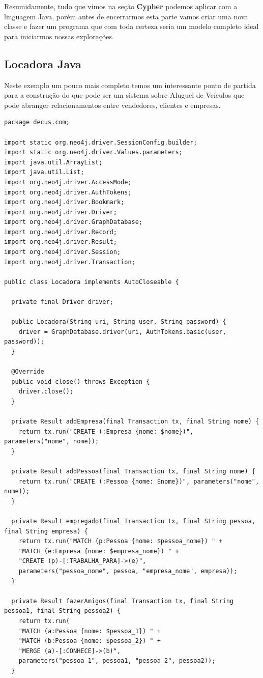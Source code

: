 Resumidamente, tudo que vimos na seção \textbf{Cypher} podemos aplicar com a linguagem Java, porém antes de encerrarmos esta parte vamos criar uma nova classe e fazer um programa que com toda certeza seria um modelo completo ideal para iniciarmos nossas explorações.

\subsection{Locadora Java}
Neste exemplo um pouco mais completo temos um interessante ponto de partida para a construção do que pode ser um sistema sobre Aluguel de Veículos que pode abranger relacionamentos entre vendedores, clientes e empresas.
\begin{lstlisting}[]
package decus.com;

import static org.neo4j.driver.SessionConfig.builder;
import static org.neo4j.driver.Values.parameters;
import java.util.ArrayList;
import java.util.List;
import org.neo4j.driver.AccessMode;
import org.neo4j.driver.AuthTokens;
import org.neo4j.driver.Bookmark;
import org.neo4j.driver.Driver;
import org.neo4j.driver.GraphDatabase;
import org.neo4j.driver.Record;
import org.neo4j.driver.Result;
import org.neo4j.driver.Session;
import org.neo4j.driver.Transaction;

public class Locadora implements AutoCloseable {

  private final Driver driver;
  
  public Locadora(String uri, String user, String password) {
    driver = GraphDatabase.driver(uri, AuthTokens.basic(user, password));
  }

  @Override
  public void close() throws Exception {
    driver.close();
  }

  private Result addEmpresa(final Transaction tx, final String nome) {
    return tx.run("CREATE (:Empresa {nome: $nome})", parameters("nome", nome));
  }

  private Result addPessoa(final Transaction tx, final String nome) {
    return tx.run("CREATE (:Pessoa {nome: $nome})", parameters("nome", nome));
  }

  private Result empregado(final Transaction tx, final String pessoa, final String empresa) {
    return tx.run("MATCH (p:Pessoa {nome: $pessoa_nome}) " +
    "MATCH (e:Empresa {nome: $empresa_nome}) " +
    "CREATE (p)-[:TRABALHA_PARA]->(e)",
    parameters("pessoa_nome", pessoa, "empresa_nome", empresa));
  }

  private Result fazerAmigos(final Transaction tx, final String pessoa1, final String pessoa2) {
    return tx.run(
    "MATCH (a:Pessoa {nome: $pessoa_1}) " +
    "MATCH (b:Pessoa {nome: $pessoa_2}) " +
    "MERGE (a)-[:CONHECE]->(b)",
    parameters("pessoa_1", pessoa1, "pessoa_2", pessoa2));
  }


\end{lstlisting}
